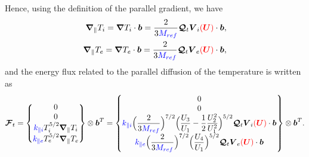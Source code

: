 \documentclass[a4paper,10pt]{article}
\newcommand{\bm}[1]{\text{\boldmath$#1$\unboldmath}}
\newcommand{\Grad}{\bm{\nabla}}
\renewcommand{\b}{\bm{b}}
\newcommand{\DiscFunc}[1]{\bm{#1}}
\newcommand{\SecOrdTens}[1]{\bm{\mathcal{#1}}}
\renewcommand{\u}{\DiscFunc{U}}
\newcommand{\F}{\SecOrdTens{F}}
\newcommand{\G}{\SecOrdTens{Q}}
\newcommand{\Gt}{\G_t}
\newcommand{\Gradpar}{\Grad_{\parallel}}
\newcommand{\nd}[1]{{\color{blue} #1\color{black}}} %
\newcommand{\fo}[1]{{ \color{red} ( #1 )\color{black} }} %
\def\Mref{\nd{M_{ref}}}
\def\kpai{\nd{k_{\parallel i}}}
\def\kpae{\nd{k_{\parallel e}}}
\begin{document}
Hence, using the definition of the parallel gradient, we have
\begin{align*}
 \Gradpar T_i = \Grad T_i \cdot \b = \frac{2}{3 \Mref }\Gt  \bm{V}_i\fo{\u} \cdot \b,\\
 \Gradpar T_e = \Grad T_e \cdot \b = \frac{2}{3 \Mref }\Gt  \bm{V}_e\fo{\u} \cdot \b,\\
\end{align*}
and the energy flux related to the parallel diffusion of the temperature is written as
\begin{equation*}
 \F_t = \begin{Bmatrix}
                     0 \\
                     0\\
                    \kpai T_i^{5/2}\Gradpar T_i\\
                    \kpae T_e^{5/2}\Gradpar T_e\\
       \end{Bmatrix}\otimes \b^T = 
       \begin{Bmatrix}
                     0 \\
                     0 \\
                  \kpai \Big(\dfrac{2}{3 \Mref}\Big)^{7/2}\Big(\dfrac{U_3}{U_1}- \dfrac{1}{2}\dfrac{U_2^2}{U_1^2}\Big)^{5/2}\Gt  \bm{V}_i\fo{\u} \cdot \b\\
                  \kpae \Big(\dfrac{2}{3 \Mref}\Big)^{7/2}\Big(\dfrac{U_4}{U_1}\Big)^{5/2}\Gt  \bm{V}_e\fo{\u} \cdot \b
       \end{Bmatrix}\otimes \b^T.
\end{equation*}
\end{document}
